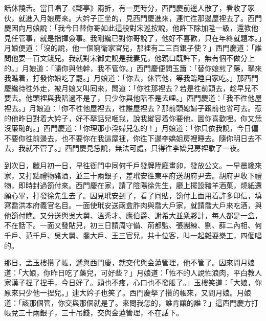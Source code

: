 話休饒舌。當日唱了《郵亭》兩折，有一更時分，西門慶前邊人散了，看收了家伙，就進入月娘房來。大妗子正坐的，見西門慶進來，連忙徃那邊屋裡去了。西門慶因向月娘說：「我今日替你哥如此這般對宋巡按說，他許下除加陞一級，還教他見任管事，就是指揮僉事。我剛纔已對你哥說了，他好不喜歡，只在年終就題本。」月娘便道：「沒的說，他一個窮衛家官兒，那裡有二三百銀子使？」西門慶道：「誰問他要一百文錢兒。我就對宋御史說是我妻兄，他親口既許下，無有個不做分上的。」月娘道：「隨你與他幹，我不管你。」西門慶便問玉簫：「替你娘煎了藥，拏來我瞧着，打發你娘吃了罷。」月娘道：「你去，休管他，等我臨睡自家吃。」那西門慶纔待徃外走，被月娘又叫囘來，問道：「你徃那裡去？若是徃前頭去，趁早兒不要去。他頭裡與我陪過不是了，只少你與他陪不是去哩。」{}西門慶道：「我不徃他屋裡去。」月娘道：「你不徃他屋裡去，徃誰屋裡去？那前頭媳婦子跟前也省可去。惹的他昨日對着大妗子，好不拏話兒咂我，說我縱容着你要他，圖你喜歡哩。你又恁沒廉恥的。」西門慶道：「你理那小淫婦兒怎的！」{}月娘道：「你只依我說，今日偏不要你徃前邊去，也不要你在我這屋裡，你徃下邊李嬌姐房裡睡去。隨你明日去不去，我就不管了。」西門慶見恁說，無法可處，只得徃李嬌兒房裡歇了一夜。

到次日，臘月初一日，早徃衙門中同何千戶發牌陞廳畫卯，發放公文。一早晨纔來家，又打點禮物豬酒，並三十兩銀子，差玳安徃東平府送胡府尹去。胡府尹收下禮物，即時封過箚付來。西門慶在家，請了陰陽徐先生，廳上擺設豬羊酒菓，燒紙還願心畢，打發徐先生去了。因見玳安到了，看了囘貼，箚付上面用着許多印信，填寫喬洪本府義官名目。一面使玳安送兩盒胙肉與喬大戶家，就請喬大戶來吃酒，與他箚付瞧。又分送與吳大舅、溫秀才、應伯爵、謝希大並衆夥計，每人都是一盒，不在話下。一面又發貼兒，初三日請周守備、荊都監、張團練、劉、薛二內相、何千戶、范千戶、吳大舅、喬大戶、王三官兒，共十位客，叫一起雜耍樂工，四個唱的。

那日，孟玉樓攢了帳，遞與西門慶，就交代與金蓮管理，他不管了。因來問月娘道：「大娘，你昨日吃了藥兒，可好些？」月娘道：「恠不的人說恠浪肉，平白教人家漢子捏了捏手，今日好了。{}頭也不疼，心口也不發脹了。」玉樓笑道：「大娘，你原來只少他一捏兒。」連大妗子也笑了。西門慶拏了攢的帳來，又問月娘。月娘道：「該那個管，你交與那個就是了。來問我怎的，誰肯讓的誰？」{}這西門慶方打帳兌三十兩銀子，三十吊錢，交與金蓮管理，不在話下。


